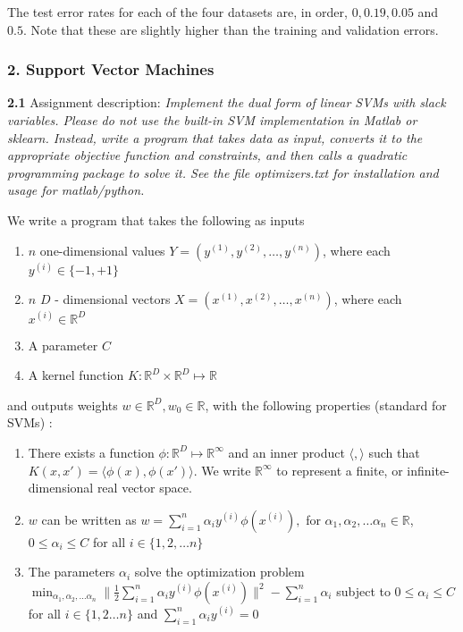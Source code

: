 \documentclass[10pt]{article}
\newcommand{\ds}{\displaystyle}
\begin{document}
The test error rates for each of the four datasets are, in order, $\ds 0, 0.19, 0.05$ and $\ds 0.5$. Note that these are slightly higher than the training and validation errors.
\subsubsection*{2. Support Vector Machines}

\textbf{2.1}
Assignment description: \emph{Implement the dual form of linear SVMs with slack variables. Please do not use the built-in SVM implementation
in Matlab or sklearn. Instead, write a program that takes data as input, converts it to the
appropriate objective function and constraints, and then calls a quadratic programming package to solve
it. See the file optimizers.txt for installation and usage for matlab/python.}

We write a program that takes the following as inputs
\begin{enumerate}
\item $\ds n$ one-dimensional values $\ds Y = (y^{(1)}, y^{(2)}, \dots, y^{(n)})$, where each $\ds y^{(i)} \in \{-1, +1\}$
\item $\ds n$ $\ds D$ - dimensional vectors $\ds X = (x^{(1)}, x^{(2)}, \dots, x^{(n)})$, where each $\ds x^{(i)} \in\mathbb R^D$
\item A parameter $\ds C$
\item A kernel function $\ds K:\mathbb R^D\times \mathbb R^D \mapsto \mathbb R$
\end{enumerate}

and outputs weights $\ds w\in \mathbb R^D, w_0\in\mathbb R$, with the following properties (standard for SVMs) :

\begin{enumerate}
\item There exists a function $\ds\phi: \mathbb R^D \mapsto \mathbb R^{\infty}$ and an inner product $\ds \langle, \rangle$ such that $\ds K(x, x') = \langle\phi(x), \phi(x')\rangle$. We write $\ds \mathbb R^{\infty}$ to represent a finite, or infinite-dimensional real vector space.
\item $\ds w$ can be written as $\ds w = \sum_{i=1}^{n} \alpha_i y^{(i)} \phi(x^{(i)}),$ for $\ds \alpha_1, \alpha_2, \dots \alpha_n \in \mathbb R$, $\ds 0\leq \alpha_i\leq C$ for all $\ds i\in \{1, 2, \dots n\}$
\item The parameters $\ds \alpha_i$ solve the optimization problem $\ds \min_{\alpha_1, \alpha_2, \dots \alpha_n} \|\frac{1}{2}\sum_{i=1}^{n} \alpha_i y^{(i)} \phi(x^{(i)}) \|^2 - \sum_{i=1}^{n} \alpha_i$ subject to $\ds 0\leq \alpha_i\leq C$ for all $\ds i\in \{1, 2\dots n\}$ and $\ds \sum_{i=1}^{n} \alpha_i y^{(i)} =0$
\end{enumerate}
\end{document}
